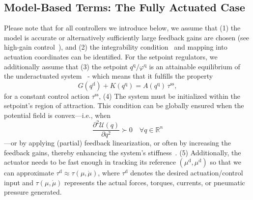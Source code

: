 \subsection{Model-Based Terms: The Fully Actuated Case}\label{sub:background:model_based_control:model_based_terms_fully_actuated}
Please note that for all controllers we introduce below, we assume that (1) the model is accurate or alternatively sufficiently large feedback gains are chosen (see high-gain control~\citep{marino1985high}), and (2) the integrability condition~\citep{pustina2024input} and mapping into actuation coordinates can be identified.
For the setpoint regulators, we additionally assume that (3) the setpoint $q^\mathrm{q}/\varphi^\mathrm{q}$ is an attainable equilibrium of the underactuated system~\citep{pustina2022feedback} - which means that it fulfills the property
\begin{equation}
    G(q^\mathrm{d}) + K(q^\mathrm{q}) = A(q^\mathrm{q}) \, \tau^\mathrm{ss},
\end{equation}
for a constant control action $\tau^\mathrm{ss}$, 
(4) The system must be initialized within the setpoint’s region of attraction. This condition can be globally ensured when the potential field is convex—i.e., when
\begin{equation}
    \frac{\partial^2 \mathcal{U}(q)}{\partial q^2} \succ 0 \quad \forall q \in \mathbb{R}^n
\end{equation}
—or by applying (partial) feedback linearization, or often by increasing the feedback gains, thereby enhancing the system’s stiffness~\citep{della2017controlling, della2023model}. (5) Additionally, the actuator needs to be fast enough in tracking its reference $(\mu^\mathrm{d}, \mu^\mathrm{d})$ so that we can approximate $\tau^\mathrm{d} \approx \tau(\mu,\dot{\mu})$, where $\tau^\mathrm{d}$ denotes the desired actuation/control input and $\tau(\mu,\dot{\mu})$ represents the actual forces, torques, currents, or pneumatic pressure generated.


